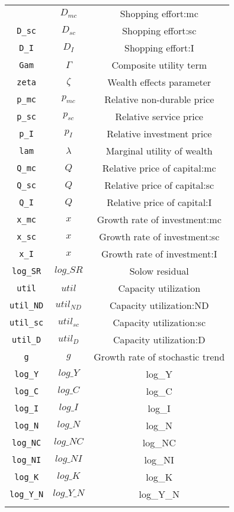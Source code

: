 \begin{center}
\begin{longtable}{ccc}
{\texttt{D\_mc} & ${D_{mc}}$ & Shopping effort:mc\\
\texttt{D\_sc} & ${D_{sc}}$ & Shopping effort:sc\\
\texttt{D\_I} & ${D_I}$ & Shopping effort:I\\
\texttt{Gam} & ${\Gamma}$ & Composite utility term\\
\texttt{zeta} & ${\zeta}$ & Wealth effects parameter\\
\texttt{p\_mc} & ${p_{mc}}$ & Relative non-durable price\\
\texttt{p\_sc} & ${p_{sc}}$ & Relative service price\\
\texttt{p\_I} & ${p_I}$ & Relative investment price\\
\texttt{lam} & ${\lambda}$ & Marginal utility of wealth\\
\texttt{Q\_mc} & ${Q}$ & Relative price of capital:mc\\
\texttt{Q\_sc} & ${Q}$ & Relative price of capital:sc\\
\texttt{Q\_I} & ${Q}$ & Relative price of capital:I\\
\texttt{x\_mc} & ${x}$ & Growth rate of investment:mc\\
\texttt{x\_sc} & ${x}$ & Growth rate of investment:sc\\
\texttt{x\_I} & ${x}$ & Growth rate of investment:I\\
\texttt{log\_SR} & $log\_SR$ & Solow residual\\
\texttt{util} & ${util}$ & Capacity utilization\\
\texttt{util\_ND} & ${util_{ND}}$ & Capacity utilization:ND\\
\texttt{util\_sc} & ${util_{sc}}$ & Capacity utilization:sc\\
\texttt{util\_D} & ${util_D}$ & Capacity utilization:D\\
\texttt{g} & ${g}$ & Growth rate of stochastic trend\\
\texttt{log\_Y} & $log\_Y$ & log\_Y\\
\texttt{log\_C} & $log\_C$ & log\_C\\
\texttt{log\_I} & $log\_I$ & log\_I\\
\texttt{log\_N} & $log\_N$ & log\_N\\
\texttt{log\_NC} & $log\_NC$ & log\_NC\\
\texttt{log\_NI} & $log\_NI$ & log\_NI\\
\texttt{log\_K} & $log\_K$ & log\_K\\
\texttt{log\_Y\_N} & $log\_Y\_N$ & log\_Y\_N\\
}
\end{longtable}
\end{center}

